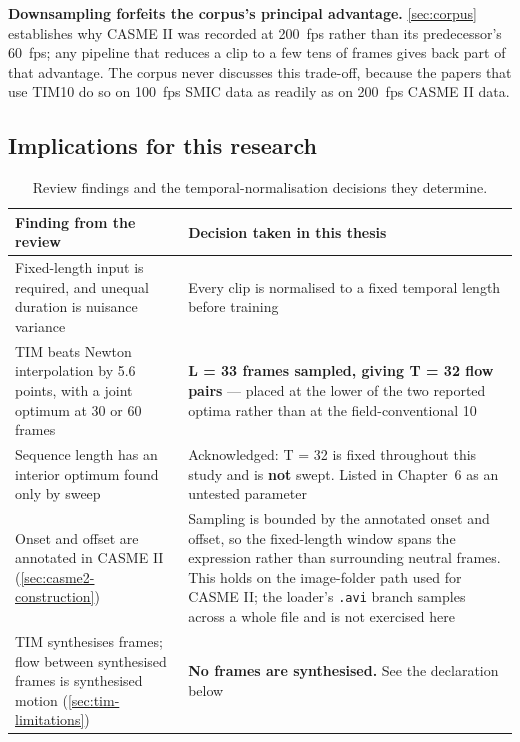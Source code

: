 \textbf{Downsampling forfeits the corpus's principal advantage.} \autoref{sec:corpus} establishes why CASME II was recorded at 200~fps rather than its predecessor's 60~fps; any pipeline that reduces a clip to a few tens of frames gives back part of that advantage. The corpus never discusses this trade-off, because the papers that use TIM10 do so on 100~fps SMIC data as readily as on 200~fps CASME II data.

\subsection{Implications for this research}
\label{sec:tim-implications}

\begin{table}[htbp]
	\centering
	\footnotesize
	\begin{tabular}{p{6.0cm} p{6.5cm}}
		\hline
		\textbf{Finding from the review} & \textbf{Decision taken in this thesis} \\
		\hline
		Fixed-length input is required, and unequal duration is nuisance variance~\cite{lu2015} & Every clip is normalised to a fixed temporal length before training \\
		TIM beats Newton interpolation by 5.6 points, with a joint optimum at 30 or 60 frames~\cite{ben2021} & \textbf{L = 33 frames sampled, giving T = 32 flow pairs} --- placed at the lower of the two reported optima rather than at the field-conventional 10 \\
		Sequence length has an interior optimum found only by sweep~\cite{ben2021} & Acknowledged: T = 32 is fixed throughout this study and is \textbf{not} swept. Listed in Chapter~6 as an untested parameter \\
		Onset and offset are annotated in CASME II (\autoref{sec:casme2-construction}) & Sampling is bounded by the annotated onset and offset, so the fixed-length window spans the expression rather than surrounding neutral frames. This holds on the image-folder path used for CASME II; the loader's \texttt{.avi} branch samples across a whole file and is not exercised here \\
		TIM synthesises frames; flow between synthesised frames is synthesised motion (\autoref{sec:tim-limitations}) & \textbf{No frames are synthesised.} See the declaration below \\
		\hline
	\end{tabular}
	\caption[Review findings and the temporal-normalisation decisions they determine]{Review findings and the temporal-normalisation decisions they determine.}
	\label{tab:tim-decisions}
\end{table}

